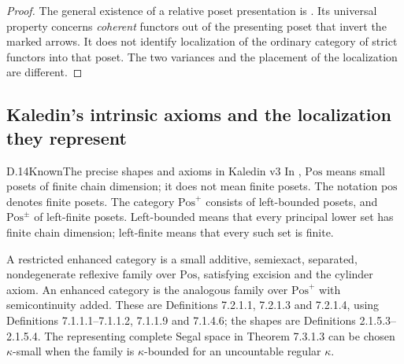 \begin{proof}
The general existence of a relative poset presentation is
\citet[Theorem 6.3.6.1, tag 02MD]{ALurie2026}. Its universal property
concerns \emph{coherent} functors out of the presenting poset that
invert the marked arrows. It does not identify localization of the
ordinary category of strict functors into that poset. The two
variances and the placement of the localization are different.
\end{proof}

\subsection{Kaledin's intrinsic axioms and the localization they represent}

\begin{result}{D.14}{Known}{The precise shapes and axioms in Kaledin v3}
In \citet{DKaledin2026}, $\mathrm{Pos}$ means small posets of finite
chain dimension; it does not mean finite posets. The notation
$\mathrm{pos}$ denotes finite posets. The category $\mathrm{Pos}^{+}$
consists of left-bounded posets, and $\mathrm{Pos}^{\pm}$ of left-finite
posets. Left-bounded means that every principal lower set has finite
chain dimension; left-finite means that every such set is finite.

A restricted enhanced category is a small additive, semiexact,
separated, nondegenerate reflexive family over $\mathrm{Pos}$,
satisfying excision and the cylinder axiom. An enhanced category is
the analogous family over $\mathrm{Pos}^{+}$ with semicontinuity
added. These are Definitions 7.2.1.1, 7.2.1.3 and 7.2.1.4, using
Definitions 7.1.1.1--7.1.1.2, 7.1.1.9 and 7.1.4.6; the shapes are
Definitions 2.1.5.3--2.1.5.4. The representing complete Segal space in
Theorem 7.3.1.3 can be chosen $\kappa$-small when the family is
$\kappa$-bounded for an uncountable regular $\kappa$.
\end{result}
